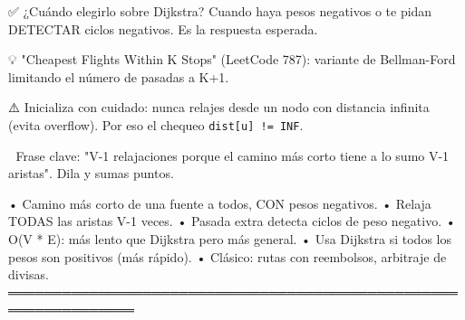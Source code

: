 \begin{dsaentrevistas}

✅ ¿Cuándo elegirlo sobre Dijkstra? Cuando haya pesos negativos o te
   pidan DETECTAR ciclos negativos. Es la respuesta esperada.

💡 "Cheapest Flights Within K Stops" (LeetCode 787): variante de
   Bellman-Ford limitando el número de pasadas a K+1.

⚠️ Inicializa con cuidado: nunca relajes desde un nodo con distancia
   infinita (evita overflow). Por eso el chequeo \verb|dist[u] != INF|.

🔑 Frase clave: "V-1 relajaciones porque el camino más corto tiene a lo
   sumo V-1 aristas". Dila y sumas puntos.

\end{dsaentrevistas}

\begin{dsaresumen}

• Camino más corto de una fuente a todos, CON pesos negativos.
• Relaja TODAS las aristas V-1 veces.
• Pasada extra detecta ciclos de peso negativo.
• O(V * E): más lento que Dijkstra pero más general.
• Usa Dijkstra si todos los pesos son positivos (más rápido).
• Clásico: rutas con reembolsos, arbitraje de divisas.
════════════════════════════════════════════════════════════════

\end{dsaresumen}
